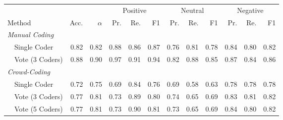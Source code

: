 \footnotesize
\begin{tabularx}{\textwidth}{lXXrrrrrrrrrrr}
\toprule
& & & & & \multicolumn{3}{c}{Positive} & \multicolumn{3}{c}{Neutral} & \multicolumn{3}{c}{Negative} \\
\cmidrule(r){6-8}\cmidrule(lr){9-11} \cmidrule(l){12-14} 
\multicolumn{3}{l}{Method} & Acc. & $\alpha$ & Pr. & Re. & F1& Pr. & Re. & F1 & Pr. & Re. & F1 \\
\midrule

\multicolumn{11}{l}{\emph{ Manual Coding }} \\

 & \multicolumn{2}{l}{ Single Coder }& \cellcolor[gray]{0.59} 0.82& \cellcolor[gray]{0.59} 0.82& \cellcolor[gray]{0.56} 0.88& \cellcolor[gray]{0.57} 0.86& \cellcolor[gray]{0.57} 0.87& \cellcolor[gray]{0.62} 0.76& \cellcolor[gray]{0.60} 0.81& \cellcolor[gray]{0.61} 0.78& \cellcolor[gray]{0.58} 0.84& \cellcolor[gray]{0.60} 0.80& \cellcolor[gray]{0.59} 0.82\\

 & \multicolumn{2}{l}{ Vote (3 Coders) }& \cellcolor[gray]{0.56} 0.88& \cellcolor[gray]{0.55} 0.90& \cellcolor[gray]{0.52} 0.97& \cellcolor[gray]{0.54} 0.91& \cellcolor[gray]{0.53} 0.94& \cellcolor[gray]{0.59} 0.82& \cellcolor[gray]{0.56} 0.88& \cellcolor[gray]{0.58} 0.85& \cellcolor[gray]{0.56} 0.87& \cellcolor[gray]{0.58} 0.84& \cellcolor[gray]{0.57} 0.86\\


\multicolumn{11}{l}{\emph{ Crowd-Coding }} \\

 & \multicolumn{2}{l}{ Single Coder }& \cellcolor[gray]{0.64} 0.72& \cellcolor[gray]{0.62} 0.75& \cellcolor[gray]{0.65} 0.69& \cellcolor[gray]{0.58} 0.84& \cellcolor[gray]{0.62} 0.76& \cellcolor[gray]{0.66} 0.69& \cellcolor[gray]{0.71} 0.58& \cellcolor[gray]{0.69} 0.63& \cellcolor[gray]{0.61} 0.78& \cellcolor[gray]{0.61} 0.78& \cellcolor[gray]{0.61} 0.78\\

 & \multicolumn{2}{l}{ Vote (3 Coders) }& \cellcolor[gray]{0.62} 0.77& \cellcolor[gray]{0.60} 0.81& \cellcolor[gray]{0.63} 0.73& \cellcolor[gray]{0.55} 0.89& \cellcolor[gray]{0.60} 0.80& \cellcolor[gray]{0.63} 0.74& \cellcolor[gray]{0.67} 0.65& \cellcolor[gray]{0.65} 0.69& \cellcolor[gray]{0.58} 0.83& \cellcolor[gray]{0.59} 0.81& \cellcolor[gray]{0.59} 0.82\\

 & \multicolumn{2}{l}{ Vote (5 Coders) }& \cellcolor[gray]{0.62} 0.77& \cellcolor[gray]{0.59} 0.81& \cellcolor[gray]{0.63} 0.73& \cellcolor[gray]{0.55} 0.90& \cellcolor[gray]{0.60} 0.81& \cellcolor[gray]{0.64} 0.73& \cellcolor[gray]{0.67} 0.65& \cellcolor[gray]{0.66} 0.69& \cellcolor[gray]{0.58} 0.84& \cellcolor[gray]{0.60} 0.80& \cellcolor[gray]{0.59} 0.82\\



\end{tabularx}
